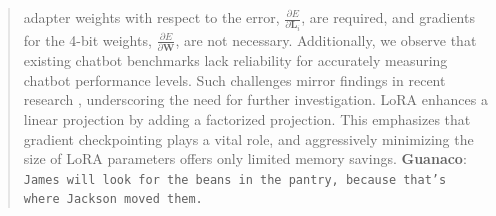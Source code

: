 \begin{quote}
adapter weights with respect to the error, $\frac{\partial E}{\partial \mathbf{L}_i}$, are required, and gradients for the 4-bit weights, $\frac{\partial E}{\partial \mathbf{W}}$, are not necessary. Additionally, we observe that existing chatbot benchmarks lack reliability for accurately measuring chatbot performance levels. Such challenges mirror findings in recent research \cite{sap2022neural}, underscoring the need for further investigation. LoRA enhances a linear projection by adding a factorized projection. This emphasizes that gradient checkpointing plays a vital role, and aggressively minimizing the size of LoRA parameters offers only limited memory savings. \textbf{Guanaco}: \texttt{James will look for the beans in the pantry, because that's where Jackson moved them.}
\end{quote}

